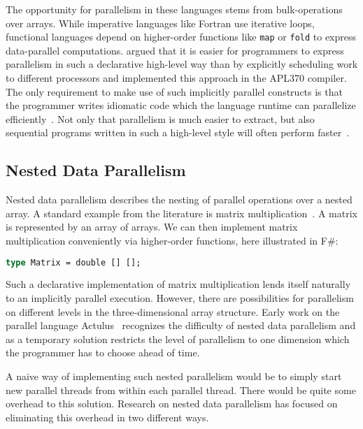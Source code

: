 \documentclass[a4paper]{article}
\begin{document}
The opportunity for parallelism in these languages stems from
bulk-operations over arrays. While imperative languages like Fortran
use iterative loops, functional languages depend on higher-order
functions like \texttt{map} or \texttt{fold} to express data-parallel
computations. \citet{Ching:1990:APA:97808.97826} argued that it is
easier for programmers to express parallelism in such a declarative
high-level way than by explicitly scheduling work to different
processors and implemented this approach in the APL370 compiler. The
only requirement to make use of such implicitly parallel constructs is
that the programmer writes idiomatic code which the language runtime
can parallelize
efficiently~\cite{Bernecky:2015:AEP:2774959.2774962}. Not only that
parallelism is much easier to extract, but also sequential programs
written in such a high-level style will often perform
faster~\cite{Bernecky:2015:AEP:2774959.2774962}.

\subsection{Nested Data Parallelism}
\label{sec:nest-data-parall}

Nested data parallelism describes the nesting of parallel operations
over a nested array. A standard example from the literature is matrix
multiplication~\cite{Keller:2010:RSP:1863543.1863582}. A matrix is
represented by an array of arrays. We can then implement matrix
multiplication conveniently via higher-order functions, here
illustrated in F\#:

\begin{lstlisting}[language=ML]
type Matrix = double [] [];
\end{lstlisting}

Such a declarative implementation of matrix multiplication lends
itself naturally to an implicitly parallel execution. However, there
are possibilities for parallelism on different levels in the
three-dimensional array structure. Early work on the parallel language
Actulus~\cite{Perrott:1979:LAV:357073.357075} recognizes the
difficulty of nested data parallelism and as a temporary solution
restricts the level of parallelism to one dimension which the
programmer has to choose ahead of time.

A naive way of implementing such nested parallelism would be to simply
start new parallel threads from within each parallel thread. There
would be quite some overhead to this solution. Research on nested data
parallelism has focused on eliminating this overhead in two different
ways.
\end{document}
